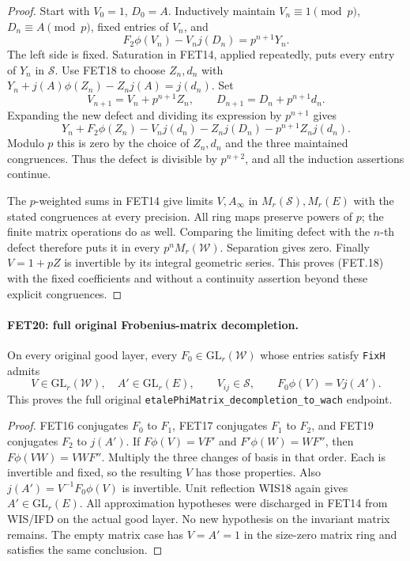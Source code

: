 \documentclass[11pt,a4paper]{article}
\numberwithin{equation}{section}
\theoremstyle{remark}\newtheorem{remark}[theorem]{Remark}
\begin{document}
\begin{proof}
Start with $V_0=1$, $D_0=A$. Inductively maintain
$V_n\equiv1\pmod p$, $D_n\equiv A\pmod p$, fixed entries
of $V_n$, and
\[
 F_2\phi(V_n)-V_nj(D_n)=p^{n+1}Y_n.
\]
The left side is fixed. Saturation in FET14, applied repeatedly,
puts every entry of $Y_n$ in $\mathcal S$. Use FET18 to choose
$Z_n,d_n$ with
$Y_n+j(A)\phi(Z_n)-Z_nj(A)=j(d_n)$.
Set
\[
 V_{n+1}=V_n+p^{n+1}Z_n,\qquad
 D_{n+1}=D_n+p^{n+1}d_n.
\]
Expanding the new defect and dividing its expression by
$p^{n+1}$ gives
\[
 Y_n+F_2\phi(Z_n)-V_nj(d_n)-Z_nj(D_n)
                                  -p^{n+1}Z_nj(d_n).
\]
Modulo $p$ this is zero by the choice of $Z_n,d_n$ and the
three maintained congruences. Thus the defect is divisible by
$p^{n+2}$, and all the induction assertions continue.

The $p$-weighted sums in FET14 give limits $V,A_\infty$ in
$M_r(\mathcal S),M_r(E)$ with the stated congruences at every
precision. All ring maps preserve powers of $p$; the finite
matrix operations do as well. Comparing the limiting defect
with the $n$-th defect therefore puts it in every
$p^nM_r(\mathcal W)$. Separation gives zero.
Finally $V=1+pZ$ is invertible by its integral geometric
series. This proves (FET.18) with the fixed coefficients and
without a continuity assertion beyond these explicit congruences.
\end{proof}

\paragraph{FET20: full original Frobenius-matrix decompletion.}
\label{claim:FET20}
On every original good layer, every
$F_0\in\mathrm{GL}_r(\mathcal W)$ whose entries satisfy
\texttt{Fix\allowbreak H} admits
\[
 V\in\mathrm{GL}_r(\mathcal W),\quad A'\in\mathrm{GL}_r(E),
 \qquad V_{ij}\in\mathcal S,\qquad
                          F_0\phi(V)=Vj(A').              \tag{FET.19}
\]
This proves the full original
\texttt{etale\allowbreak Phi\allowbreak Matrix\_\allowbreak decompletion\_\allowbreak to\_\allowbreak wach} endpoint.

\begin{proof}
FET16 conjugates $F_0$ to $F_1$, FET17 conjugates $F_1$ to
$F_2$, and FET19 conjugates $F_2$ to $j(A')$.
If $F\phi(V)=VF'$ and $F'\phi(W)=WF''$, then
$F\phi(VW)=VWF''$. Multiply the three changes of basis in
that order. Each is invertible and fixed, so the resulting $V$
has those properties. Also
$j(A')=V^{-1}F_0\phi(V)$ is invertible. Unit reflection WIS18
again gives $A'\in\mathrm{GL}_r(E)$.
All approximation hypotheses were discharged in FET14 from
WIS/IFD on the actual good layer. No new hypothesis on the
invariant matrix remains. The empty matrix case has $V=A'=1$
in the size-zero matrix ring and satisfies the same conclusion.
\end{proof}
\end{document}

